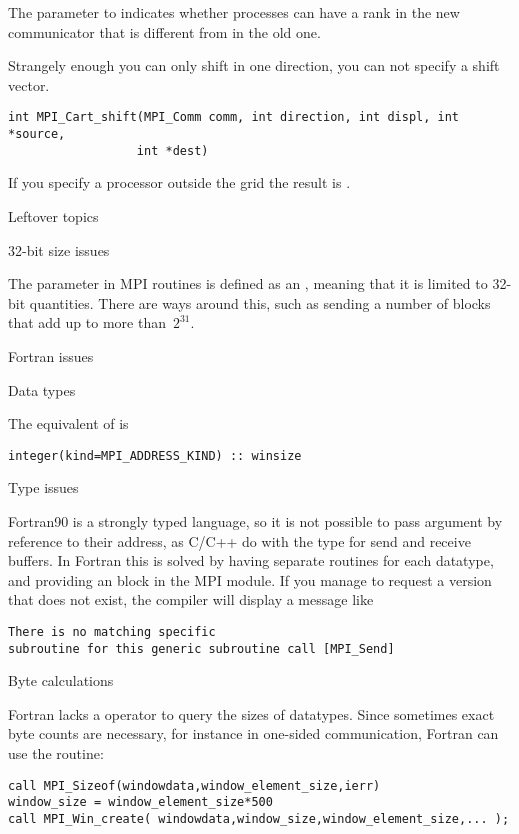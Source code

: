 The  parameter to 
indicates whether processes can have a rank
in the new communicator that is different from in the old one.

Strangely enough you can only shift in one direction, you can not
specify a shift vector.
\begin{verbatim}
int MPI_Cart_shift(MPI_Comm comm, int direction, int displ, int *source, 
                  int *dest)
\end{verbatim}
If you specify a processor outside the grid
the result is .

 {Leftover topics}

 {32-bit size issues}

The  parameter in MPI routines is defined as an ,
meaning that it is limited to 32-bit quantities.  There are ways
around this, such as sending a number of
 blocks that add up to more than~$2^{31}$.

 {Fortran issues}

 {Data types}

The equivalent of  is
\begin{verbatim}
integer(kind=MPI_ADDRESS_KIND) :: winsize
\end{verbatim}

 {Type issues}

Fortran90 is a strongly typed language, so it is not possible to pass
argument by reference to their address, as C/C++ do with the 
type for send and receive buffers. In Fortran this is solved by having
separate routines for each datatype, and providing an  block
in the MPI module. If you manage to request a version that does not exist,
the compiler will display a message like
\begin{verbatim}
There is no matching specific 
subroutine for this generic subroutine call [MPI_Send]
\end{verbatim}

 {Byte calculations}
\label{sec:f-sizeof}

Fortran lacks a  operator to query the sizes of datatypes.
Since sometimes exact byte counts are necessary,
for instance in one-sided communication,
Fortran can use the  routine:
\begin{verbatim}
call MPI_Sizeof(windowdata,window_element_size,ierr)
window_size = window_element_size*500
call MPI_Win_create( windowdata,window_size,window_element_size,... );
\end{verbatim}

